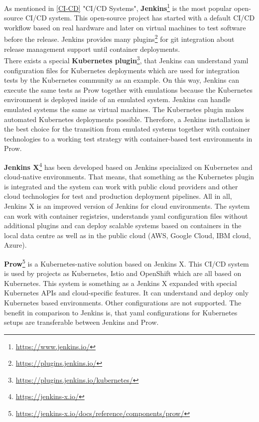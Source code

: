 As mentioned in \ref{CI-CD} "CI/CD Systems", \textbf{Jenkins}\footnote{\url{https://www.jenkins.io/}} is the most popular open-source \gls{CI/CD} system. This open-source project has started with a default \gls{CI/CD} workflow based on real hardware and later on virtual machines to test software before the release. Jenkins provides many plugins\footnote{\url{https://plugins.jenkins.io/}} for git integration about release management support until container deployments. \\
There exists a special \textbf{Kubernetes plugin}\footnote{\url{https://plugins.jenkins.io/kubernetes/}}, that Jenkins can understand yaml configuration files for Kubernetes deployments which are used for integration tests by the Kubernetes community as an example. On this way, Jenkins can execute the same tests as Prow together with emulations because the Kubernetes environment is deployed inside of an emulated system. Jenkins can handle emulated systems the same as virtual machines. The Kubernetes plugin makes automated Kubernetes deployments possible. Therefore, a Jenkins installation is the best choice for the transition from emulated systems together with container technologies to a working test strategy with container-based test environments in Prow.

\textbf{Jenkins X}\footnote{\url{https://jenkins-x.io/}} has been developed based on Jenkins specialized on Kubernetes and cloud-native environments. That means, that something as the Kubernetes plugin is integrated and the system can work with public cloud providers and other cloud technologies for test and production deployment pipelines. All in all, Jenkins X is an improved version of Jenkins for cloud environments. The system can work with container registries, understands yaml configuration files without additional plugins and can deploy scalable systems based on containers in the local data centre as well as in the public cloud (AWS, Google Cloud, IBM cloud, Azure).

\textbf{Prow}\footnote{\url{https://jenkins-x.io/docs/reference/components/prow/}} is a Kubernetes-native solution based on Jenkins X. This \gls{CI/CD} system is used by projects as Kubernetes, Istio and OpenShift which are all based on Kubernetes. This system is something as a Jenkins X expanded with special Kubernetes APIs and cloud-specific features. It can understand and deploy only Kubernetes based environments. Other configurations are not supported. The benefit in comparison to Jenkins is, that yaml configurations for Kubernetes setups are transferable between Jenkins and Prow.

